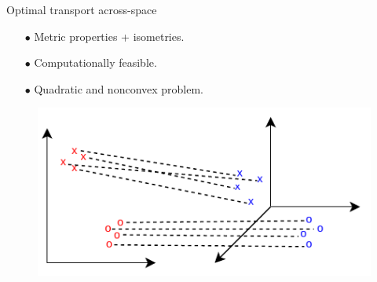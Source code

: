 \documentclass{beamer}
\begin{document}
\begin{frame}{Optimal transport across-space}
\vspace{-0.3cm}
\begin{minipage}[t]{0.5\linewidth}
\begin{itemize}
  \item[$\bullet$] Metric properties + isometries.
  \item[$\bullet$] Computationally feasible.
  \item[$\bullet$] Quadratic and nonconvex problem.
\end{itemize}
\end{minipage}%
\hfill%
\hspace{-6cm}
\begin{minipage}[t]{0.5\linewidth}
  \vspace{0.5cm}
\begin{figure}
  \centering
  \includegraphics[width=1.15\linewidth, keepaspectratio=true]{OT_new/gw.pdf}
\end{figure}
\end{minipage}

\end{frame}
\end{document}
